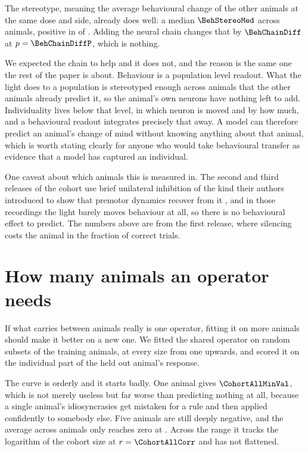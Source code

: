 \documentclass[11pt,letterpaper]{article}
\begin{document}
The stereotype, meaning the average behavioural change of the other animals at the same
dose and side, already does well: a median $\BehStereoMed$ across animals, positive in
\BehStereoPos{} of \BehStereoN. Adding the neural chain changes that by
$\BehChainDiff$ at $p = \BehChainDiffP$, which is nothing.

We expected the chain to help and it does not, and the reason is the same one the rest
of the paper is about. Behaviour is a population level readout. What the light does to
a population is stereotyped enough across animals that the other animals already
predict it, so the animal's own neurons have nothing left to add. Individuality lives
below that level, in which neuron is moved and by how much, and a behavioural readout
integrates precisely that away. A model can therefore predict an animal's change of
mind without knowing anything about that animal, which is worth stating clearly for
anyone who would take behavioural transfer as evidence that a model has captured an
individual.

One caveat about which animals this is measured in. The second and third releases of
the cohort use brief unilateral inhibition of the kind their authors introduced to show
that premotor dynamics recover from it \citep{alm_wide_b}, and in those recordings the
light barely moves behaviour at all, so there is no behavioural effect to predict. The
numbers above are from the first release, where silencing costs the animal
\AlmBehDrop{} in the fraction of correct trials.

\section{How many animals an operator needs}

If what carries between animals really is one operator, fitting it on more animals
should make it better on a new one. We fitted the shared operator on random subsets of
the training animals, at every size from one upwards, and scored it on the individual
part of the held out animal's response.

The curve is orderly and it starts badly. One animal gives $\CohortAllMinVal$, which is
not merely useless but far worse than predicting nothing at all, because a single
animal's idiosyncrasies get mistaken for a rule and then applied confidently to somebody
else. Five animals are still deeply negative, and the average across animals only
reaches zero at \CohortAllMaxN. Across the range it tracks the logarithm of the cohort
size at $r = \CohortAllCorr$ and has not flattened.
\end{document}
